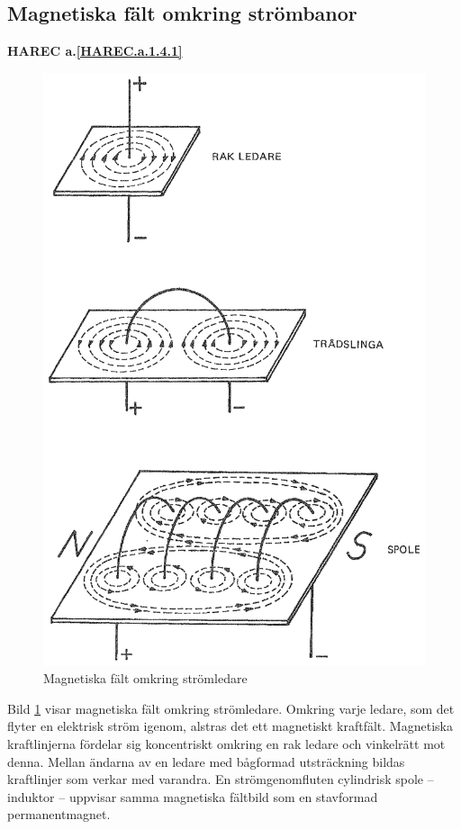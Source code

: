 \subsection{Magnetiska fält omkring strömbanor}
\textbf{HAREC a.\ref{HAREC.a.1.4.1}\label{myHAREC.a.1.4.1}}

\begin{figure}
  \includegraphics[width=\textwidth]{images/cropped_pdfs/bild_2_1-08.pdf}
  \caption{Magnetiska fält omkring strömledare}
  \label{fig:BildII1-8}
\end{figure}

Bild \ref{fig:BildII1-8} visar magnetiska fält omkring strömledare.
Omkring varje ledare, som det flyter en elektrisk ström igenom, alstras det ett
magnetiskt kraftfält.
Magnetiska kraftlinjerna fördelar sig koncentriskt omkring en rak ledare och
vinkelrätt mot denna.
Mellan ändarna av en ledare med bågformad utsträckning bildas kraftlinjer som
verkar med varandra.
En strömgenomfluten cylindrisk spole -- induktor -- uppvisar samma magnetiska
fältbild som en stavformad permanentmagnet.

